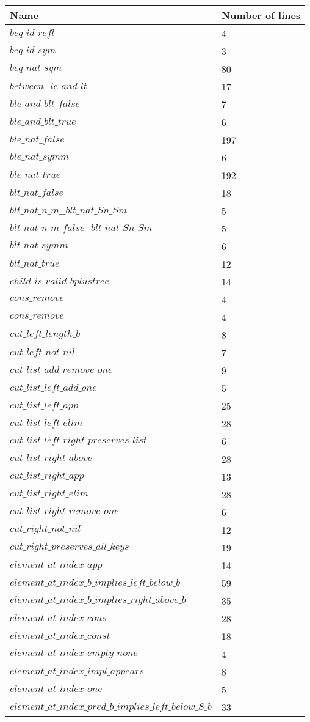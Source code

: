 \begin{tabular}{| l | l |}
\hline
Name & Number of lines \\ \hline
$beq\_id\_refl$ & 4 \\ \hline
$beq\_id\_sym$ & 3 \\ \hline
$beq\_nat\_sym$ & 80 \\ \hline
$between\_\_le\_and\_lt$ & 17 \\ \hline
$ble\_and\_blt\_false$ & 7 \\ \hline
$ble\_and\_blt\_true$ & 6 \\ \hline
$ble\_nat\_false$ & 197 \\ \hline
$ble\_nat\_symm$ & 6 \\ \hline
$ble\_nat\_true$ & 192 \\ \hline
$blt\_nat\_false$ & 18 \\ \hline
$blt\_nat\_n\_m\_\_blt\_nat\_Sn\_Sm$ & 5 \\ \hline
$blt\_nat\_n\_m\_false\_\_blt\_nat\_Sn\_Sm$ & 5 \\ \hline
$blt\_nat\_symm$ & 6 \\ \hline
$blt\_nat\_true$ & 12 \\ \hline
$child\_is\_valid\_bplustree$ & 14 \\ \hline
$cons\_remove$ & 4 \\ \hline
$cons\_remove$ & 4 \\ \hline
$cut\_left\_length\_b$ & 8 \\ \hline
$cut\_left\_not\_nil$ & 7 \\ \hline
$cut\_list\_add\_remove\_one$ & 9 \\ \hline
$cut\_list\_left\_add\_one$ & 5 \\ \hline
$cut\_list\_left\_app$ & 25 \\ \hline
$cut\_list\_left\_elim$ & 28 \\ \hline
$cut\_list\_left\_right\_preserves\_list$ & 6 \\ \hline
$cut\_list\_right\_above$ & 28 \\ \hline
$cut\_list\_right\_app$ & 13 \\ \hline
$cut\_list\_right\_elim$ & 28 \\ \hline
$cut\_list\_right\_remove\_one$ & 6 \\ \hline
$cut\_right\_not\_nil$ & 12 \\ \hline
$cut\_right\_preserves\_all\_keys$ & 19 \\ \hline
$element\_at\_index\_app$ & 14 \\ \hline
$element\_at\_index\_b\_implies\_left\_below\_b$ & 59 \\ \hline
$element\_at\_index\_b\_implies\_right\_above\_b$ & 35 \\ \hline
$element\_at\_index\_cons$ & 28 \\ \hline
$element\_at\_index\_const$ & 18 \\ \hline
$element\_at\_index\_empty\_none$ & 4 \\ \hline
$element\_at\_index\_impl\_appears$ & 8 \\ \hline
$element\_at\_index\_one$ & 5 \\ \hline
$element\_at\_index\_pred\_b\_implies\_left\_below\_S\_b$ & 33 \\ \hline
\end{tabular}
